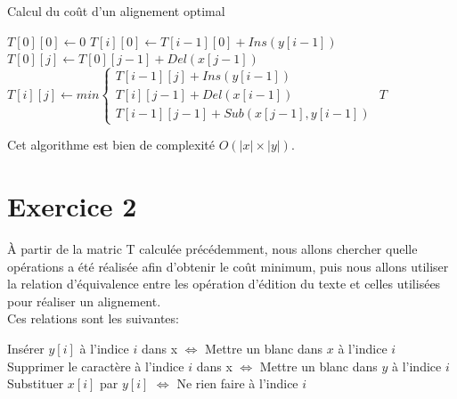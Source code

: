 \documentclass{article}
\begin{document}
\begin{algorithm}
\caption{Calcul du coût d'un alignement optimal}\label{algo:cout}
\begin{algorithmic}[1]
	\State $T[0][0] \gets 0 $
		\State $T[i][0] \gets T[i-1][0] + Ins(y[i-1])$
	\EndFor
		\State $T[0][j] \gets T[0][j-1] + Del(x[j-1])$
	\EndFor
			\State $T[i][j] \gets min\begin{cases}
							T[i-1][j] + Ins(y[i-1])\\
							T[i][j-1] + Del(x[i-1])\\
							T[i-1][j-1] + Sub(x[j-1],y[i-1])
							\end{cases}$
		\EndFor
	\EndFor
	\State \Return $T$	
\EndProcedure
\end{algorithmic}
\end{algorithm}
Cet algorithme est bien de complexité $O(\lvert x\rvert \times \lvert y\rvert)$.
 

\section{Exercice 2}


À partir de la matric T calculée précédemment, nous allons chercher quelle
opérations a été réalisée afin d'obtenir le coût minimum, puis nous allons
utiliser la relation d'équivalence entre les opération d'édition du texte et
celles utilisées pour réaliser un alignement.\\
Ces relations sont les suivantes:
\begin{center}
	Insérer $y[i]$ à l'indice $i$ dans x  $\Leftrightarrow$ Mettre un blanc dans $x$ à l'indice $i$ \\
	Supprimer le caractère à l'indice $i$ dans x $\Leftrightarrow$ Mettre un blanc dans $y$ à l'indice $i$\\
	Substituer $x[i]$ par $y[i]$ $\Leftrightarrow$ Ne rien faire à l'indice $i$ 
\end{center}
\end{document}
